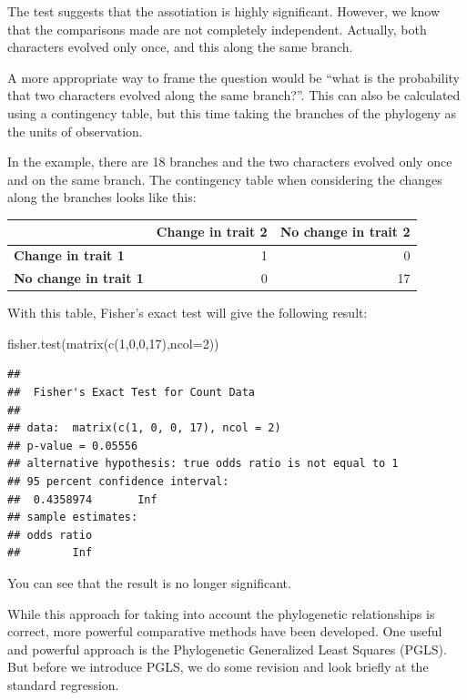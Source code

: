 \documentclass[
]{book}
\newenvironment{Shaded}{\begin{snugshade}}{\end{snugshade}}
\newcommand{\AttributeTok}[1]{\textcolor[rgb]{0.77,0.63,0.00}{#1}}
\newcommand{\DecValTok}[1]{\textcolor[rgb]{0.00,0.00,0.81}{#1}}
\newcommand{\FunctionTok}[1]{\textcolor[rgb]{0.00,0.00,0.00}{#1}}
\newcommand{\NormalTok}[1]{#1}
\begin{document}
The test suggests that the assotiation is highly significant. However, we know that the comparisons made are not completely independent. Actually, both characters evolved only once, and this along the same branch.

A more appropriate way to frame the question would be ``what is the probability that two characters evolved along the same branch?''. This can also be calculated using a contingency table, but this time taking the branches of the phylogeny as the units of observation.

In the example, there are 18 branches and the two characters evolved only once and on the same branch. The contingency table when considering the changes along the branches looks like this:

\begin{tabular}{>{}l|r|r}
\hline
  & Change in trait 2 & No change in trait 2\\
\hline
\textbf{Change in trait 1} & 1 & 0\\
\hline
\textbf{No change in trait 1} & 0 & 17\\
\hline
\end{tabular}

With this table, Fisher's exact test will give the following result:

\begin{Shaded}
\begin{Highlighting}[]
\FunctionTok{fisher.test}\NormalTok{(}\FunctionTok{matrix}\NormalTok{(}\FunctionTok{c}\NormalTok{(}\DecValTok{1}\NormalTok{,}\DecValTok{0}\NormalTok{,}\DecValTok{0}\NormalTok{,}\DecValTok{17}\NormalTok{),}\AttributeTok{ncol=}\DecValTok{2}\NormalTok{))}
\end{Highlighting}
\end{Shaded}

\begin{verbatim}
## 
##  Fisher's Exact Test for Count Data
## 
## data:  matrix(c(1, 0, 0, 17), ncol = 2)
## p-value = 0.05556
## alternative hypothesis: true odds ratio is not equal to 1
## 95 percent confidence interval:
##  0.4358974       Inf
## sample estimates:
## odds ratio 
##        Inf
\end{verbatim}

You can see that the result is no longer significant.

While this approach for taking into account the phylogenetic relationships is correct, more powerful comparative methods have been developed. One useful and powerful approach is the Phylogenetic Generalized Least Squares (PGLS). But before we introduce PGLS, we do some revision and look briefly at the standard regression.
\end{document}
